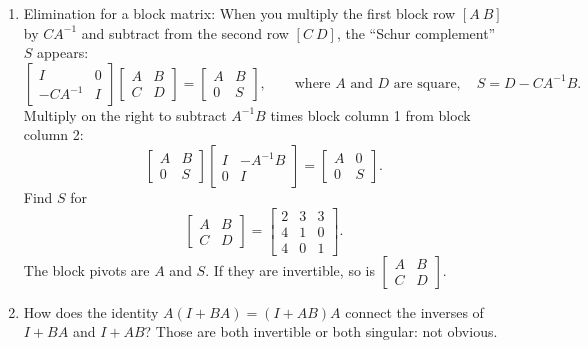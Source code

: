 \documentclass[14pt, a4paper]{article}
\begin{document}
\begin{enumerate}[resume]
    \item Elimination for a block matrix: When you multiply the first block row $[A\ B]$ by $C A^{-1}$ and subtract from the second row $[C\ D]$, the ``Schur complement'' $S$ appears:
          \[
              \begin{bmatrix}
                  I         & 0 \\
                  -C A^{-1} & I
              \end{bmatrix}
              \begin{bmatrix}
                  A & B \\
                  C & D
              \end{bmatrix}
              =
              \begin{bmatrix}
                  A & B \\
                  0 & S
              \end{bmatrix},
              \qquad
              \text{where } A \text{ and } D \text{ are square},\quad
              S = D - C A^{-1} B.
          \]
          Multiply on the right to subtract $A^{-1}B$ times block column 1 from block column 2:
          \[
              \begin{bmatrix}
                  A & B \\
                  0 & S
              \end{bmatrix}
              \begin{bmatrix}
                  I & -A^{-1}B \\
                  0 & I
              \end{bmatrix}
              =
              \begin{bmatrix}
                  A & 0 \\
                  0 & S
              \end{bmatrix}.
          \]
          Find $S$ for
          \[
              \begin{bmatrix}
                  A & B \\
                  C & D
              \end{bmatrix}
              =
              \begin{bmatrix}
                  2 & 3 & 3 \\
                  4 & 1 & 0 \\
                  4 & 0 & 1
              \end{bmatrix}.
          \]
          The block pivots are $A$ and $S$. If they are invertible, so is $\begin{bmatrix} A & B \\ C & D \end{bmatrix}$.

    \item How does the identity $A(I + BA) = (I + AB)A$ connect the inverses of $I + BA$ and $I + AB$? Those are both invertible or both singular: not obvious.
\end{enumerate}
\end{document}
